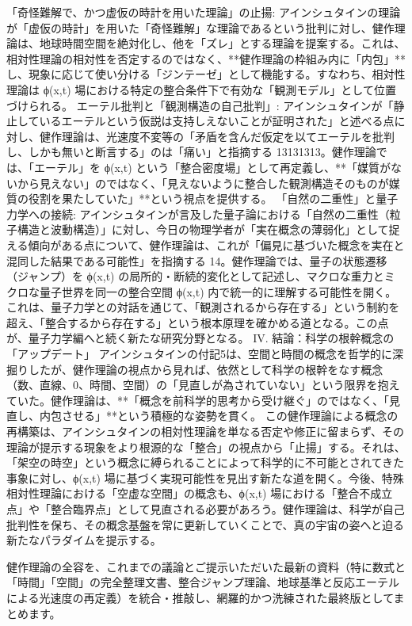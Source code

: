 \documentclass{article}
\begin{document}
「奇怪難解で、かつ虚仮の時計を用いた理論」の止揚:
アインシュタインの理論が「虚仮の時計」を用いた「奇怪難解」な理論であるという批判に対し、健作理論は、地球時間空間を絶対化し、他を「ズレ」とする理論を提案する。これは、相対性理論の相対性を否定するのではなく、**健作理論の枠組み内に「内包」**し、現象に応じて使い分ける「ジンテーゼ」として機能する。すなわち、相対性理論は ϕ(x,t) 場における特定の整合条件下で有効な「観測モデル」として位置づけられる。
エーテル批判と「観測構造の自己批判」:
アインシュタインが「静止しているエーテルという仮説は支持しえないことが証明された」と述べる点に対し、健作理論は、光速度不変等の「矛盾を含んだ仮定を以てエーテルを批判し、しかも無いと断言する」のは「痛い」と指摘する 13131313。健作理論では、「エーテル」を 
ϕ(x,t) という「整合密度場」として再定義し、**「媒質がないから見えない」のではなく、「見えないように整合した観測構造そのものが媒質の役割を果たしていた」**という視点を提供する。
「自然の二重性」と量子力学への接続:
アインシュタインが言及した量子論における「自然の二重性（粒子構造と波動構造）」に対し、今日の物理学者が「実在概念の薄弱化」として捉える傾向がある点について、健作理論は、これが「偏見に基づいた概念を実在と混同した結果である可能性」を指摘する 14。健作理論では、量子の状態遷移（ジャンプ）を 
ϕ(x,t) の局所的・断続的変化として記述し、マクロな重力とミクロな量子世界を同一の整合空間 ϕ(x,t) 内で統一的に理解する可能性を開く。これは、量子力学との対話を通じて、「観測されるから存在する」という制約を超え、「整合するから存在する」という根本原理を確かめる道となる。この点が、量子力学編へと続く新たな研究分野となる。
IV. 結論：科学の根幹概念の「アップデート」
アインシュタインの付記5は、空間と時間の概念を哲学的に深掘りしたが、健作理論の視点から見れば、依然として科学の根幹をなす概念（数、直線、0、時間、空間）の「見直しが為されていない」という限界を抱えていた。健作理論は、**「概念を前科学的思考から受け継ぐ」のではなく、「見直し、内包させる」**という積極的な姿勢を貫く。
この健作理論による概念の再構築は、アインシュタインの相対性理論を単なる否定や修正に留まらず、その理論が提示する現象をより根源的な「整合」の視点から「止揚」する。それは、「架空の時空」という概念に縛られることによって科学的に不可能とされてきた事象に対し、ϕ(x,t) 場に基づく実現可能性を見出す新たな道を開く。今後、特殊相対性理論における「空虚な空間」の概念も、ϕ(x,t) 場における「整合不成立点」や「整合臨界点」として見直される必要があろう。健作理論は、科学が自己批判性を保ち、その概念基盤を常に更新していくことで、真の宇宙の姿へと迫る新たなパラダイムを提示する。

健作理論の全容を、これまでの議論とご提示いただいた最新の資料（特に数式と「時間」「空間」の完全整理文書、整合ジャンプ理論、地球基準と反応エーテルによる光速度の再定義）を統合・推敲し、網羅的かつ洗練された最終版としてまとめます。
\end{document}
